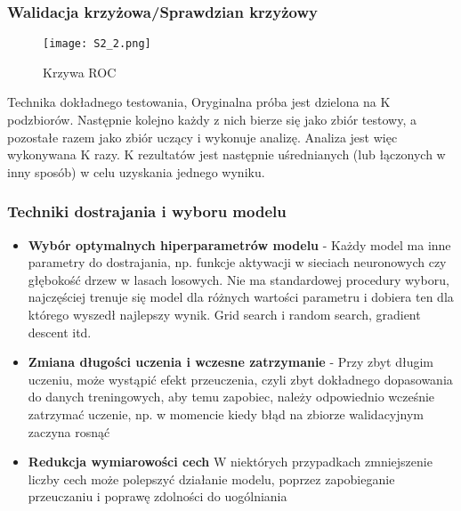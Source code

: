 \subsubsection{Walidacja krzyżowa/Sprawdzian krzyżowy}

\begin{figure}[H]
	\centering
	\texttt{[image: S2\_2.png]}
	\caption{Krzywa ROC}
\end{figure}

Technika dokładnego testowania, Oryginalna próba jest dzielona na K podzbiorów. Następnie kolejno każdy z nich bierze się jako zbiór testowy, a pozostałe razem jako zbiór uczący i wykonuje analizę. Analiza jest więc wykonywana K razy. K rezultatów jest następnie uśrednianych (lub łączonych w inny sposób) w celu uzyskania jednego wyniku.

\subsubsection{Techniki dostrajania i wyboru modelu}

\begin{itemize}
	\item \textbf{Wybór optymalnych hiperparametrów modelu} - Każdy model ma inne parametry do dostrajania, np. funkcje aktywacji w sieciach neuronowych czy głębokość drzew w lasach losowych. Nie ma standardowej procedury wyboru, najczęściej trenuje się model dla różnych wartości parametru i dobiera ten dla którego wyszedł najlepszy wynik. Grid search i random search, gradient descent itd.
	\item \textbf{Zmiana długości uczenia i wczesne zatrzymanie} - Przy zbyt długim uczeniu, może wystąpić efekt przeuczenia, czyli zbyt dokładnego dopasowania do danych treningowych, aby temu zapobiec, należy odpowiednio wcześnie zatrzymać uczenie, np. w momencie kiedy błąd na zbiorze walidacyjnym zaczyna rosnąć
	\item \textbf{Redukcja wymiarowości cech} W niektórych przypadkach zmniejszenie liczby cech może polepszyć działanie modelu, poprzez zapobieganie przeuczaniu i poprawę zdolności do uogólniania
\end{itemize}






















